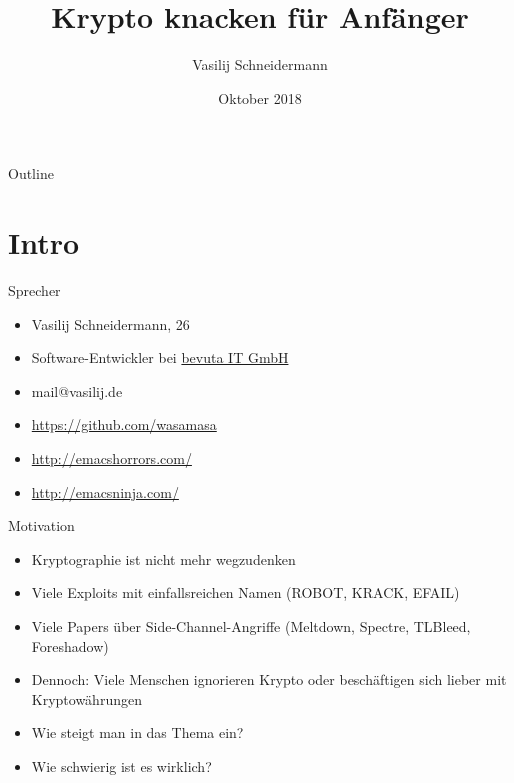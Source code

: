\documentclass[presentation]{beamer}
\author{Vasilij Schneidermann}
\date{Oktober 2018}
\title{Krypto knacken für Anfänger}
\begin{document}
\maketitle
\begin{frame}{Outline}
\tableofcontents
\end{frame}

\AtBeginSection{\frame{\sectionpage}}

\section{Intro}
\label{sec:org78160f1}

\begin{frame}[label={sec:org36f2fcc}]{Sprecher}
\begin{itemize}
\item Vasilij Schneidermann, 26
\item Software-Entwickler bei \href{https://www.bevuta.com/en/}{bevuta IT GmbH}
\item mail@vasilij.de
\item \url{https://github.com/wasamasa}
\item \url{http://emacshorrors.com/}
\item \url{http://emacsninja.com/}
\end{itemize}
\end{frame}

\begin{frame}[label={sec:org74fa714}]{Motivation}
\begin{itemize}
\item Kryptographie ist nicht mehr wegzudenken
\item Viele Exploits mit einfallsreichen Namen (ROBOT, KRACK, EFAIL)
\item Viele Papers über Side-Channel-Angriffe (Meltdown, Spectre, TLBleed,
Foreshadow)
\item Dennoch: Viele Menschen ignorieren Krypto oder beschäftigen sich
lieber mit Kryptowährungen
\item Wie steigt man in das Thema ein?
\item Wie schwierig ist es wirklich?
\end{itemize}
\end{frame}
\end{document}
